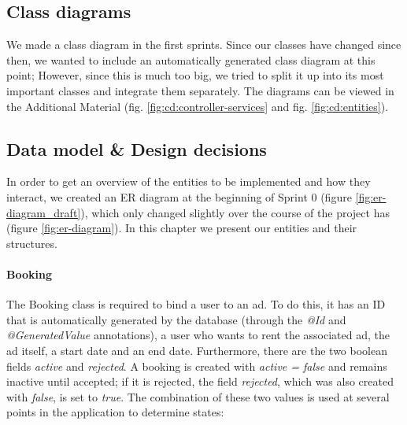 \subsection{Class diagrams}
We made a class diagram in the first sprints. Since our classes have changed since then, we wanted to include an automatically generated class diagram at this point; However, since this is much too big, we tried to split it up into its most important classes and integrate them separately. The diagrams can be viewed in the Additional Material (fig. \ref{fig:cd:controller-services} and fig. \ref{fig:cd:entities}).

\subsection{Data model \& Design decisions}
In order to get an overview of the entities to be implemented and how they interact, we created an ER diagram at the beginning of Sprint 0 (figure \ref{fig:er-diagram_draft}), which only changed slightly over the course of the project has (figure \ref{fig:er-diagram}). In this chapter we present our entities and their structures.

\paragraph{Booking}
The Booking class is required to bind a user to an ad. To do this, it has an ID that is automatically generated by the database (through the \textit{@Id} and \textit{@GeneratedValue} annotations), a user who wants to rent the associated ad, the ad itself, a start date and an end date. Furthermore, there are the two boolean fields \textit{active} and \textit{rejected}. A booking is created with \textit{active = false} and remains inactive until accepted; if it is rejected, the field \textit{rejected}, which was also created with \textit{false}, is set to \textit{true}. The combination of these two values is used at several points in the application to determine states:


